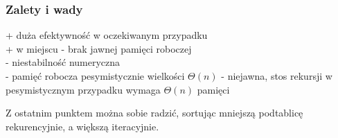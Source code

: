 \subsubsection*{Zalety i wady}
+ duża efektywność w oczekiwanym przypadku \\
+ w miejscu - brak jawnej pamięci roboczej \\
- niestabilność numeryczna \\
- pamięć robocza pesymistycznie wielkości \( \Theta(n) \) - niejawna, stos rekursji w pesymistycznym przypadku wymaga \( \Theta(n) \) pamięci

Z ostatnim punktem można sobie radzić, sortując mniejszą podtablicę rekurencyjnie, a większą iteracyjnie.
